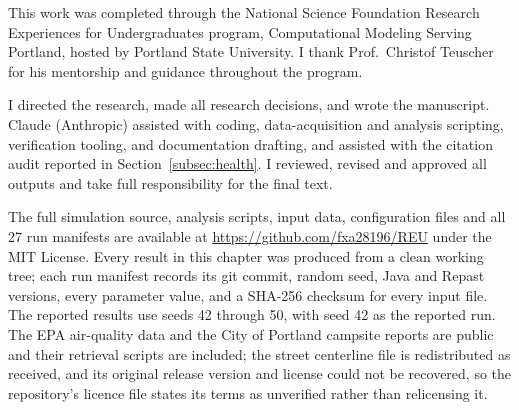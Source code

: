 \documentclass[graybox]{svmult}
\begin{document}
\begin{acknowledgement}
This work was completed through the National Science Foundation Research
Experiences for Undergraduates program, Computational Modeling Serving Portland,
hosted by Portland State University. I thank Prof.\ Christof Teuscher for his
mentorship and guidance throughout the program.

I directed the research, made all research decisions, and wrote the manuscript.
Claude (Anthropic) assisted with coding, data-acquisition and analysis
scripting, verification tooling, and documentation drafting, and assisted with
the citation audit reported in Section~\ref{subsec:health}. I reviewed, revised
and approved all outputs and take full responsibility for the final text.
\end{acknowledgement}

 The full simulation source, analysis
scripts, input data, configuration files and all 27 run manifests are available
at \url{https://github.com/fxa28196/REU} under the MIT License. Every result in
this chapter was produced from a clean working tree; each run manifest records
its git commit, random seed, Java and Repast versions, every parameter value,
and a SHA-256 checksum for every input file. The reported results use seeds 42
through 50, with seed 42 as the reported run. The EPA air-quality data and the
City of Portland campsite reports are public and their retrieval scripts are
included; the street centerline file is redistributed as received, and its
original release version and license could not be recovered, so the repository's
licence file states its terms as unverified rather than relicensing it.



\end{document}
